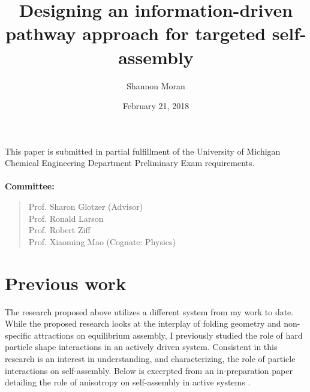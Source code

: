 \documentclass[11pt]{article}   	%
\title{Designing an information-driven pathway approach for targeted self-assembly}
\author{Shannon Moran}
\date{February 21, 2018}
\begin{document}
\maketitle
\thispagestyle{empty}
\noindent
This paper is submitted in partial fulfillment of the University of Michigan Chemical Engineering Department Preliminary Exam requirements.
\\ \\
\textbf{Committee:} 
\begin{quote} 
Prof. Sharon Glotzer (Advisor) \\ Prof. Ronald Larson \\ Prof. Robert Ziff \\ Prof. Xiaoming Mao (Cognate: Physics)
\end{quote}

\newpage
\thispagestyle{empty}


%


\clearpage
\setcounter{page}{1}




%
%



%

%

\section{Previous work}

The research proposed above utilizes a different system from my work to date.
While the proposed research looks at the interplay of folding geometry and non-specific attractions on equilibrium assembly, I previously studied the role of hard particle shape interactions in an actively driven system. 
Consistent in this research is an interest in understanding, and characterizing, the role of particle interactions on self-assembly.
Below is excerpted from an in-preparation paper detailing the role of anisotropy on self-assembly in active systems \cite{Moran_2018_unpublished}. 
\end{document}
